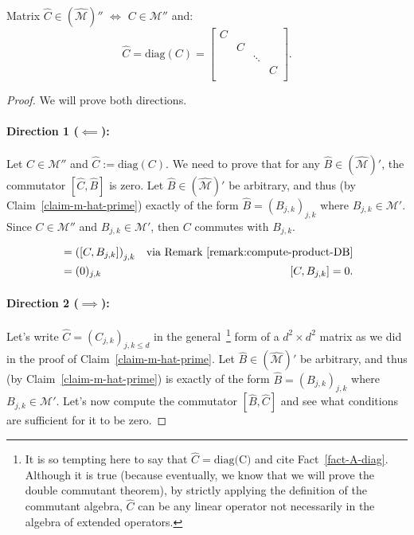 \begin{claim}\label{claim-m-hat-double-prime}
    Matrix $\widehat{C} \in (\widehat{\mathcal{M}})''$ $\iff$ $C \in \mathcal{M}''$ and:
    \begin{equation}
        \widehat{C} = \text{diag}(C) = 
    \begin{bmatrix}
    C & \\
    & C \\
    & & \ddots\\
    & & & C\\
    \end{bmatrix}.
    \end{equation}
\end{claim}
\begin{proof}
We will prove both directions.

\paragraph{Direction 1 ($\impliedby$):}
Let $C \in \mathcal{M}''$ and $\widehat{C} := \text{diag}(C)$. We need to prove that for any $\widehat{B} \in (\widehat{\mathcal{M}})'$, the commutator $[\widehat{C}, \widehat{B}]$ is zero. Let $\widehat{B} \in (\widehat{\mathcal{M}})'$ be arbitrary, and thus (by Claim~\ref{claim-m-hat-prime}) exactly of the form $\widehat{B} = \left(B_{j,k}\right)_{j,k}$ where $B_{j,k} \in \mathcal{M}'$. Since $C \in \mathcal{M}''$ and $B_{j,k} \in \mathcal{M}'$, then $C$ commutes with $B_{j,k}$.

\begin{align*}
    [\widehat{C}, \widehat{B}] &= \left([C, B_{j,k}]\right)_{j,k} & \text{via Remark~\ref{remark:compute-product-DB}}\\ 
    &= (0)_{j,k} & [C, B_{j,k}] = 0.
\end{align*}

\paragraph{Direction 2 ($\implies$):}

    Let's write $\widehat{C} = \left(C_{j,k}\right)_{j,k \leq d}$ in the general~\footnote{It is so tempting here to say that $\widehat{C} = \text{diag(C)}$ and cite Fact~\ref{fact-A-diag}. Although it is true (because eventually, we know that we will prove the double commutant theorem), by strictly applying the definition of the commutant algebra, $\widehat{C}$ can be any linear operator not necessarily in the algebra of extended operators.} form of a $d^2 \times d^2$ matrix as we did in the proof of Claim~\ref{claim-m-hat-prime}. Let $\widehat{B} \in (\widehat{\mathcal{M}})'$ be arbitrary, and thus (by Claim~\ref{claim-m-hat-prime}) is exactly of the form $\widehat{B} = \left(B_{j,k}\right)_{j,k}$ where $B_{j,k} \in \mathcal{M}'$. Let's now compute the commutator $[\widehat{B}, \widehat{C}]$ and see what conditions are sufficient for it to be zero.


\end{proof}

